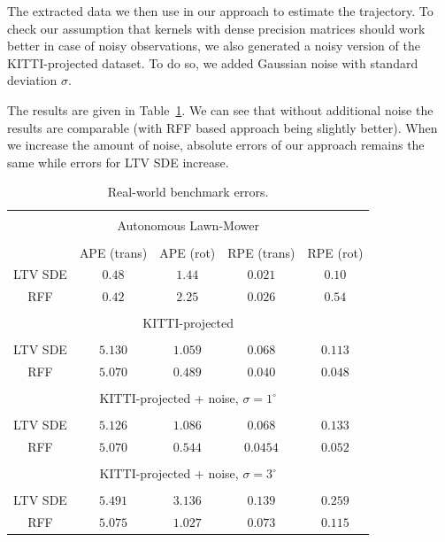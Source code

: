 The extracted data we then use in our approach to estimate the trajectory.
To check our assumption that kernels with dense precision
matrices should work better in case of noisy observations,
we also generated a noisy version of the KITTI-projected
dataset.
To do so, we added Gaussian noise with standard deviation $\sigma$.

The results are given in Table~\ref{tab:real_benchmarks_errors}.
We can see that without additional noise the results are comparable (with RFF based approach being slightly better).
When we increase the amount of noise, absolute errors of our approach remains the same
while errors for LTV SDE increase.

\begin{table}[ht]
    \centering
    \caption{Real-world benchmark errors.}
    \label{tab:real_benchmarks_errors}
    \begin{tabular}{c|c|c|c|c}
    \multicolumn{5}{l}{}\\[-0.5em]
    \multicolumn{5}{c}{Autonomous Lawn-Mower} \\
    \multicolumn{5}{l}{}\\[-0.7em]
    \toprule
    & APE (trans) & APE (rot) & RPE (trans) & RPE (rot) \\
    \hline
    LTV SDE & $0.48$ & $1.44$ & $0.021$ & $0.10$ \\
    RFF & $0.42$ & $2.25$ & $0.026$ & $0.54$ \\
    \bottomrule

    \multicolumn{5}{l}{}\\[-0.5em]
    \multicolumn{5}{c}{KITTI-projected} \\
    \multicolumn{5}{l}{}\\[-0.7em]
    \toprule
    LTV SDE & $5.130$ & $1.059$ & $0.068$ & $0.113$ \\
    RFF & $5.070$ & $0.489$ & $0.040$ & $0.048$ \\
    \bottomrule

    \multicolumn{5}{l}{}\\[-0.5em]
    \multicolumn{5}{c}{KITTI-projected + noise, $\sigma=1^\circ$} \\
    \multicolumn{5}{l}{}\\[-0.7em]
    \toprule
    LTV SDE & $5.126$ & $1.086$ & $0.068$ & $0.133$ \\
    RFF & $5.070$ & $0.544$ & $0.0454$ & $0.052$\\
    \bottomrule

    \multicolumn{5}{l}{}\\[-0.5em]
    \multicolumn{5}{c}{KITTI-projected + noise, $\sigma=3^\circ$} \\
    \multicolumn{5}{l}{}\\[-0.7em]
    \toprule
    LTV SDE & $5.491$ & $3.136$ & $0.139$ & $0.259$ \\
    RFF & $5.075$ & $1.027$ & $0.073$ & $0.115$ \\
    \bottomrule


\end{tabular}
\end{table}

